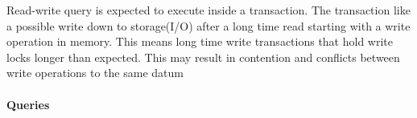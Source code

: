 
Read-write query is expected to execute inside a transaction. The transaction like a possible write down to storage(I/O) after a long time read starting with a write operation in memory. This means long time write transactions that hold write locks longer than expected. This may result in contention and conflicts between write operations to the same datum



\paragraph{Queries}
{\raggedright

}